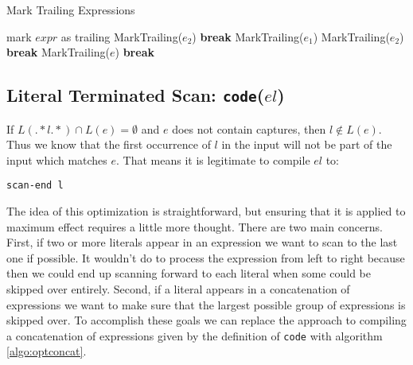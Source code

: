 \begin{algorithm}
\caption{Mark Trailing Expressions} \label{algo:marktrailing}
\begin{algorithmic}
  \State mark $expr$ as trailing
      \State MarkTrailing($e_2$)
      \State \textbf{break}
    \EndCase
      \State MarkTrailing($e_1$)
      \State MarkTrailing($e_2$)
      \State \textbf{break}
    \EndCase
    \EndCase
    \EndCase
    \EndCase
    \EndCase
      \State MarkTrailing($e$)
      \State \textbf{break}
    \EndCase
    \Case{$\epsilon$}
    \EndCase
    \Case{$\alpha$}
    \EndCase
    \EndCase
  \EndSwitch

\EndProcedure
\end{algorithmic}
\end{algorithm}

\subsection{Literal Terminated Scan: {\tt code}($el$) }
\label{section:littermscan}

If $L(.*l.*) \cap L(e) = \emptyset$ and $e$ does not contain captures,
then $l \not\in L(e)$. Thus we know that the first occurrence of $l$
in the input will not be part of the input which matches $e$. That means
it is legitimate to compile $el$ to:

\begin{verbatim}
scan-end l
\end{verbatim}

The idea of this optimization is straightforward, but ensuring that
it is applied to maximum effect requires a little more thought. There
are two main concerns. First, if two or more literals appear in an
expression we want to scan to the last one if possible. It wouldn't
do to process the expression from left to right because then we could
end up scanning forward to each literal when some could be skipped over
entirely. Second, if a literal appears in a concatenation of expressions
we want to make sure that the largest possible group of expressions
is skipped over. To accomplish these goals we can replace the approach
to compiling a concatenation of expressions given by the definition of
\verb'code' with algorithm \ref{algo:optconcat}.

